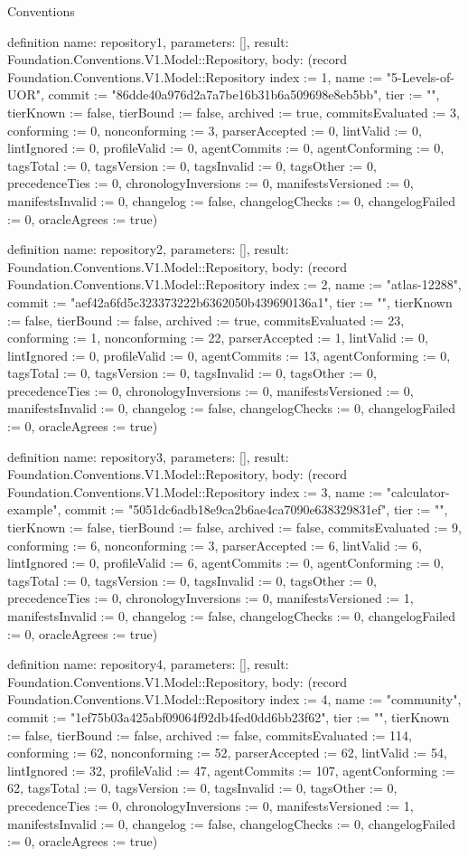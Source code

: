 \begin{lexlean}{Conventions}
\begin{semanticmodule}
definition{
  name: repository1,
  parameters: [],
  result: Foundation.Conventions.V1.Model::Repository,
  body: (record Foundation.Conventions.V1.Model::Repository {index := 1, name := "5-Levels-of-UOR", commit := "86dde40a976d2a7a7be16b31b6a509698e8eb5bb", tier := "", tierKnown := false, tierBound := false, archived := true, commitsEvaluated := 3, conforming := 0, nonconforming := 3, parserAccepted := 0, lintValid := 0, lintIgnored := 0, profileValid := 0, agentCommits := 0, agentConforming := 0, tagsTotal := 0, tagsVersion := 0, tagsInvalid := 0, tagsOther := 0, precedenceTies := 0, chronologyInversions := 0, manifestsVersioned := 0, manifestsInvalid := 0, changelog := false, changelogChecks := 0, changelogFailed := 0, oracleAgrees := true})
}

definition{
  name: repository2,
  parameters: [],
  result: Foundation.Conventions.V1.Model::Repository,
  body: (record Foundation.Conventions.V1.Model::Repository {index := 2, name := "atlas-12288", commit := "aef42a6fd5c323373222b6362050b439690136a1", tier := "", tierKnown := false, tierBound := false, archived := true, commitsEvaluated := 23, conforming := 1, nonconforming := 22, parserAccepted := 1, lintValid := 0, lintIgnored := 0, profileValid := 0, agentCommits := 13, agentConforming := 0, tagsTotal := 0, tagsVersion := 0, tagsInvalid := 0, tagsOther := 0, precedenceTies := 0, chronologyInversions := 0, manifestsVersioned := 0, manifestsInvalid := 0, changelog := false, changelogChecks := 0, changelogFailed := 0, oracleAgrees := true})
}

definition{
  name: repository3,
  parameters: [],
  result: Foundation.Conventions.V1.Model::Repository,
  body: (record Foundation.Conventions.V1.Model::Repository {index := 3, name := "calculator-example", commit := "5051dc6adb18e9ca2b6ae4ca7090e638329831ef", tier := "", tierKnown := false, tierBound := false, archived := false, commitsEvaluated := 9, conforming := 6, nonconforming := 3, parserAccepted := 6, lintValid := 6, lintIgnored := 0, profileValid := 6, agentCommits := 0, agentConforming := 0, tagsTotal := 0, tagsVersion := 0, tagsInvalid := 0, tagsOther := 0, precedenceTies := 0, chronologyInversions := 0, manifestsVersioned := 1, manifestsInvalid := 0, changelog := false, changelogChecks := 0, changelogFailed := 0, oracleAgrees := true})
}

definition{
  name: repository4,
  parameters: [],
  result: Foundation.Conventions.V1.Model::Repository,
  body: (record Foundation.Conventions.V1.Model::Repository {index := 4, name := "community", commit := "1ef75b03a425abf09064f92db4fed0dd6bb23f62", tier := "", tierKnown := false, tierBound := false, archived := false, commitsEvaluated := 114, conforming := 62, nonconforming := 52, parserAccepted := 62, lintValid := 54, lintIgnored := 32, profileValid := 47, agentCommits := 107, agentConforming := 62, tagsTotal := 0, tagsVersion := 0, tagsInvalid := 0, tagsOther := 0, precedenceTies := 0, chronologyInversions := 0, manifestsVersioned := 1, manifestsInvalid := 0, changelog := false, changelogChecks := 0, changelogFailed := 0, oracleAgrees := true})
}


\end{semanticmodule}
\end{lexlean}
